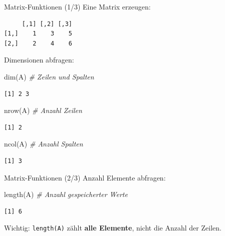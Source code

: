 \documentclass[
  10pt,
  ignorenonframetext,
  aspectratio=169,
]{beamer}
\newenvironment{Shaded}{}{}
\newcommand{\CommentTok}[1]{\textcolor[rgb]{0.38,0.63,0.69}{\textit{#1}}}
\newcommand{\FunctionTok}[1]{\textcolor[rgb]{0.02,0.16,0.49}{#1}}
\newcommand{\NormalTok}[1]{#1}
\begin{document}
\begin{frame}[fragile]{Matrix-Funktionen (1/3)}
\label{matrix-funktionen-13}
Eine Matrix erzeugen:

\begin{verbatim}
     [,1] [,2] [,3]
[1,]    1    3    5
[2,]    2    4    6
\end{verbatim}

Dimensionen abfragen:

\begin{Shaded}
\begin{Highlighting}[]
\FunctionTok{dim}\NormalTok{(A)     }\CommentTok{\# Zeilen und Spalten}
\end{Highlighting}
\end{Shaded}

\begin{verbatim}
[1] 2 3
\end{verbatim}

\begin{Shaded}
\begin{Highlighting}[]
\FunctionTok{nrow}\NormalTok{(A)   }\CommentTok{\# Anzahl Zeilen}
\end{Highlighting}
\end{Shaded}

\begin{verbatim}
[1] 2
\end{verbatim}

\begin{Shaded}
\begin{Highlighting}[]
\FunctionTok{ncol}\NormalTok{(A)   }\CommentTok{\# Anzahl Spalten}
\end{Highlighting}
\end{Shaded}

\begin{verbatim}
[1] 3
\end{verbatim}
\end{frame}

\begin{frame}[fragile]{Matrix-Funktionen (2/3)}
\label{matrix-funktionen-23}
Anzahl Elemente abfragen:

\begin{Shaded}
\begin{Highlighting}[]
\FunctionTok{length}\NormalTok{(A) }\CommentTok{\# Anzahl gespeicherter Werte}
\end{Highlighting}
\end{Shaded}

\begin{verbatim}
[1] 6
\end{verbatim}

Wichtig: \texttt{length(A)} zählt \textbf{alle Elemente}, nicht die
Anzahl der Zeilen.
\end{frame}
\end{document}
